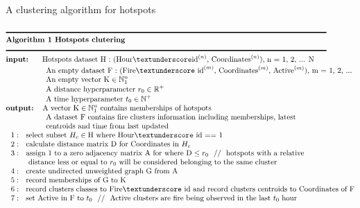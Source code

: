 \documentclass[11pt,a4paper,]{article}
\begin{document}
\normalfont
\begin{table}
\caption{\label{tab:clustering}A clustering algorithm for hotspots}
\begin{align*}
&\rule{150mm}{0.5mm}\\[-1\jot]
&\textbf{Algorithm 1 Hotspots clutering}\\[-1\jot]
&\rule{150mm}{0.5mm}\\[-1\jot]
&\textbf{input: }~~~~\text{Hotspots dataset H : (Hour}\textunderscore \text{id}^{(n)} \text{, Coordinates}^{(n)} \text{), n = 1, 2, ... N}\\[-1\jot]
&~~~~~~~~~~~~~~~~\text{An empty dataset F : (Fire\textunderscore id}^{(m)} \text{, Coordinates}^{(m)} \text{, Active}^{(m)} \text{), m = 1, 2, ...}\\[-1\jot]
&~~~~~~~~~~~~~~~~\text{An empty vector K} \in \mathbb{N}_1^n\\[-1\jot]
&~~~~~~~~~~~~~~~~\text{A distance hyperparameter }r_0 \in \mathbb{R}^+\\[-1\jot]
&~~~~~~~~~~~~~~~~\text{A time hyperparameter }t_0 \in \mathbb{N}^+\\[-1\jot]
&\textbf{output: }~~\text{A vector K} \in \mathbb{N}_1^n~\text{contains memberships of hotspots}\\[-1\jot]
&~~~~~~~~~~~~~~~~\text{A dataset F contains fire clusters information including memberships, latest}\\[-1\jot]
&~~~~~~~~~~~~~~~~\text{centroids and time from last updated}\\[-1\jot]
&~~1:~~\text{select subset }H_c \in \text{H where Hour\textunderscore id == 1}\\[-1\jot]
&~~2:~~\text{calculate distance matrix D for Coordinates in }H_c \\[-1\jot]
&~~3:~~\text{assign 1 to a zero adjacency matrix A for where D} \leq r_0~~//~~\text{hotspots with a relative}\\[-1\jot]
&~~~~~~~~~\text{distance less or equal to }r_0~\text{will be considered belonging to the same cluster} \\[-1\jot]
&~~4:~~\text{create undirected unweighted graph G from A}\\[-1\jot]
&~~5:~~\text{record memberships of G to K}\\[-1\jot]
&~~6:~~\text{record clusters classes to Fire\textunderscore id and record clusters centroids to Coordinates of F}\\[-1\jot]
&~~7:~~\text{set Active in F to }t_0~~//~~\text{Active clusters are fire being observed in the last }t_0~\text{hour}\\[-1\jot]

\end{align*}
\end{table}
\end{document}
